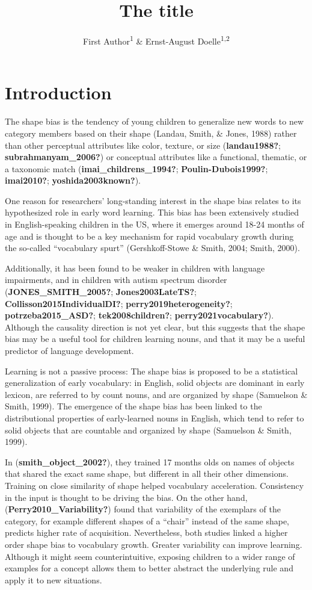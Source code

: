 \documentclass[
  english,
  man]{apa6}
\title{The title}
\author{First Author\textsuperscript{1} \& Ernst-August Doelle\textsuperscript{1,2}}
\date{}
\affiliation{\vspace{0.5cm}\textsuperscript{1} Wilhelm-Wundt-University\\\textsuperscript{2} Konstanz Business School}
\begin{document}
\maketitle

\section{Introduction}\label{introduction}

The shape bias is the tendency of young children to generalize new words to new category members based on their shape (Landau, Smith, \& Jones, 1988) rather than other perceptual attributes like color, texture, or size (\textbf{landau1988?}; \textbf{subrahmanyam\_2006?}) or conceptual attributes like a functional, thematic, or a taxonomic match (\textbf{imai\_childrens\_1994?}; \textbf{Poulin-Dubois1999?}; \textbf{imai2010?}; \textbf{yoshida2003known?}).

One reason for researchers' long-standing interest in the shape bias relates to its hypothesized role in early word learning. This bias has been extensively studied in English-speaking children in the US, where it emerges around 18-24 months of age and is thought to be a key mechanism for rapid vocabulary growth during the so-called ``vocabulary spurt'' (Gershkoff-Stowe \& Smith, 2004; Smith, 2000).

Additionally, it has been found to be weaker in children with language impairments, and in children with autism spectrum disorder (\textbf{JONES\_SMITH\_2005?}; \textbf{Jones2003LateTS?}; \textbf{Collisson2015IndividualDI?}; \textbf{perry2019heterogeneity?}; \textbf{potrzeba2015\_ASD?}; \textbf{tek2008children?}; \textbf{perry2021vocabulary?}). Although the causality direction is not yet clear, but this suggests that the shape bias may be a useful tool for children learning nouns, and that it may be a useful predictor of language development.

Learning is not a passive process: The shape bias is proposed to be a statistical generalization of early vocabulary: in English, solid objects are dominant in early lexicon, are referred to by count nouns, and are organized by shape (Samuelson \& Smith, 1999). The emergence of the shape bias has been linked to the distributional properties of early-learned nouns in English, which tend to refer to solid objects that are countable and organized by shape (Samuelson \& Smith, 1999).

In (\textbf{smith\_object\_2002?}), they trained 17 months olds on names of objects that shared the exact same shape, but different in all their other dimensions. Training on close similarity of shape helped vocabulary acceleration. Consistency in the input is thought to be driving the bias.
On the other hand, (\textbf{Perry2010\_Variability?}) found that variability of the exemplars of the category, for example different shapes of a ``chair'' instead of the same shape, predicts higher rate of acquisition. Nevertheless, both studies linked a higher order shape bias to vocabulary growth. Greater variability can improve learning. Although it might seem counterintuitive, exposing children to a wider range of examples for a concept allows them to better abstract the underlying rule and apply it to new situations.
\end{document}
